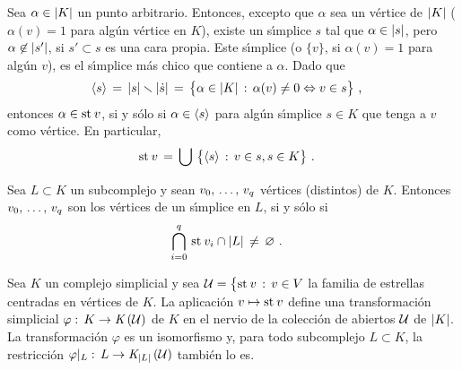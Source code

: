 Sea $\alpha\in\geom{K}$ un punto arbitrario. Entonces, excepto que $\alpha$
sea un v\'{e}rtice de $\geom{K}$ ($\alpha(v)=1$ para alg\'{u}n v\'{e}rtice
en $K$), existe un s\'{\i}mplice $s$ tal que $\alpha\in\geom{s}$, pero
$\alpha\not\in\geom{s'}$, si $s'\subset s$ es una cara propia. Este
s\'{\i}mplice (o $\{v\}$, si $\alpha(v)=1$ para alg\'{u}n $v$), es el
s\'{\i}mplice m\'{a}s chico que contiene a $\alpha$. Dado que
\begin{align*}
	\simpinterior{s} & \,=\,\geom{s}\setmin\geom{\carasp{s}} \,=\,
		\big\{\alpha\in\geom{K}\,:\,
			\alpha(v)\not =0\Leftrightarrow v\in s\big\}
		\text{ ,}
\end{align*}
%
entonces $\alpha\in\estrella{v}$, si y s\'{o}lo si $\alpha\in\simpinterior{s}$
para alg\'{u}n s\'{\i}mplice $s\in K$ que tenga a $v$ como v\'{e}rtice. En
particular,
\begin{align*}
	\estrella{v} & \,=\,\bigcup\,
		\big\{\simpinterior{s}\,:\,v\in s, s\in K\big\}
	\text{ .}
\end{align*}
%

\begin{coroSimpliceDeSubcomplejo}\label{thm:simplicedesubcomplejo}
	Sea $L\subset K$ un subcomplejo y sean $\lista[0]{v}{q}$ v\'{e}rtices
	(distintos) de $K$. Entonces $\lista[0]{v}{q}$ son los v\'{e}rtices
	de un s\'{\i}mplice en $L$, si y s\'{o}lo si
	\begin{align*}
		\bigcap_{i=0}^{q}\,\estrella{v_{i}}\cap\geom{L} & \,\not=\,
			\varnothing
		\text{ .}
	\end{align*}
\end{coroSimpliceDeSubcomplejo}

\begin{teoTodoComplejoEsNervio}\label{thm:todocomplejoesnervio}
	Sea $K$ un complejo simplicial y sea
	$\cal{U} =\big\{\estrella{v}\,:\,v\in V$ la familia de estrellas
	centradas en v\'{e}rtices de $K$. La aplicaci\'{o}n
	$v\mapsto\estrella{v}$ define una transformaci\'{o}n simplicial
	$\varphi:\,K\rightarrow\nerv{\cal{U}}$ de $K$ en el nervio de la
	colecci\'{o}n de abiertos $\cal{U}$ de $\geom{K}$. La
	transformaci\'{o}n $\varphi$ es un isomorfismo y, para todo
	subcomplejo $L\subset K$, la restricci\'{o}n
	$\varphi|_{L}:\,L\rightarrow\nerv[\geom{L}]{\cal{U}}$ tambi\'{e}n
	lo es.
\end{teoTodoComplejoEsNervio}

